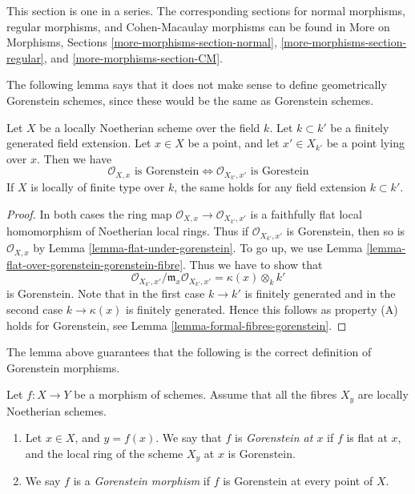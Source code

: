 \noindent
This section is one in a series. The corresponding sections for
normal morphisms,
regular morphisms, and
Cohen-Macaulay morphisms
can be found in More on Morphisms, Sections
\ref{more-morphisms-section-normal},
\ref{more-morphisms-section-regular}, and
\ref{more-morphisms-section-CM}.

\medskip\noindent
The following lemma says that it does not make sense to define
geometrically Gorenstein schemes, since these would be the
same as Gorenstein schemes.

\begin{lemma}
\label{lemma-gorenstein-base-change}
Let $X$ be a locally Noetherian scheme over the field $k$.
Let $k \subset k'$ be a finitely generated field extension.
Let $x \in X$ be a point, and let $x' \in X_{k'}$ be a point lying
over $x$. Then we have
$$
\mathcal{O}_{X, x}\text{ is Gorenstein}
\Leftrightarrow
\mathcal{O}_{X_{k'}, x'}\text{ is Gorestein}
$$
If $X$ is locally of finite type over $k$, the same holds for any
field extension $k \subset k'$.
\end{lemma}

\begin{proof}
In both cases the ring map $\mathcal{O}_{X, x} \to \mathcal{O}_{X_{k'}, x'}$
is a faithfully flat local homomorphism of Noetherian local rings.
Thus if $\mathcal{O}_{X_{k'}, x'}$ is Gorenstein, then so is
$\mathcal{O}_{X, x}$ by Lemma \ref{lemma-flat-under-gorenstein}.
To go up, we use Lemma \ref{lemma-flat-over-gorenstein-gorenstein-fibre}.
Thus we have to show that
$$
\mathcal{O}_{X_{k'}, x'}/\mathfrak m_x \mathcal{O}_{X_{k'}, x'} =
\kappa(x) \otimes_k k'
$$
is Gorenstein. Note that in the first case $k \to k'$ is finitely
generated and in the second case $k \to \kappa(x)$ is finitely
generated. Hence this follows as property (A) holds for
Gorenstein, see Lemma \ref{lemma-formal-fibres-gorenstein}.
\end{proof}

\noindent
The lemma above guarantees that the following is the correct definition
of Gorenstein morphisms.

\begin{definition}
\label{definition-gorenstein-morphism}
Let $f : X \to Y$ be a morphism of schemes.
Assume that all the fibres $X_y$ are locally Noetherian schemes.
\begin{enumerate}
\item Let $x \in X$, and $y = f(x)$. We say that $f$ is
{\it Gorenstein at $x$} if $f$ is flat at $x$, and the
local ring of the scheme $X_y$ at $x$ is Gorenstein.
\item We say $f$ is a {\it Gorenstein morphism} if $f$ is
Gorenstein at every point of $X$.
\end{enumerate}
\end{definition}

